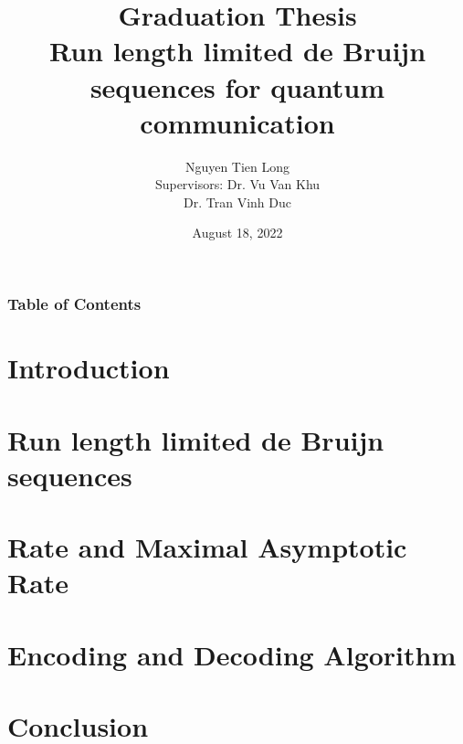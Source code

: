 \documentclass{beamer}
\title[]{{\huge \bf Graduation Thesis} \\
\large Run length limited de Bruijn sequences for quantum communication}
\author[Nguyen Tien Long]{
Nguyen Tien Long
\texorpdfstring{ \\ {\small Supervisors: Dr. Vu Van Khu}  \\ {\small \hspace{21mm} Dr. Tran Vinh Duc}}{}
}
\institute[]{
School of Information and Communication Technology.
}
\date{August 18, 2022}
\begin{document}
\begin{frame}
    \titlepage
\end{frame}

\begin{frame}
    \frametitle{Table of Contents}
    \tableofcontents
\end{frame}

% 

\section{Introduction}


\section{Run length limited de Bruijn sequences}


\section{Rate and Maximal Asymptotic Rate}

\section{Encoding and Decoding Algorithm}


\section{Conclusion}

\end{document}
